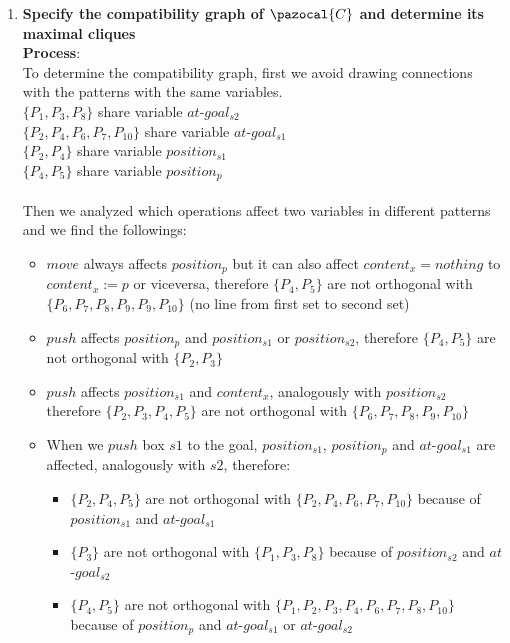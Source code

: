 \documentclass[11pt,a4paper]{article}
\begin{document}
\begin{enumerate}[label=(\alph*), listparindent=1.5em]
	\item \textbf{Specify the compatibility graph of $\pazocal{C}$ and
	determine its maximal cliques}\\
	\textbf{Process}:\\
	To determine the compatibility graph, first we avoid drawing connections with the patterns with the same variables.\\
	$\{ P_1, P_3, P_8 \}$ share variable $at$-$goal_{s2}$\\
	$\{ P_2, P_4, P_6, P_7, P_{10} \}$ share variable $at$-$goal_{s1}$\\
	$\{ P_2, P_4\}$ share variable $position_{s1}$\\
	$\{ P_4, P_5\}$ share variable $position_{p}$\\\\
	Then we analyzed which operations affect two variables in different patterns and we find the followings:
	\begin{itemize}
		\item $move$ always affects $position_p$ but it can also affect $content_x = nothing$ to $content_x := p$ or viceversa, therefore $\{ P_4, P_5 \}$ are not orthogonal with $\{P_6, P_7, P_8, P_9, P_9, P_{10}\}$ (no line from first set to second set)
		\item $push$ affects $position_p$ and $position_{s1}$ or $position_{s2}$, therefore $\{ P_4, P_5 \}$ are not orthogonal with $\{P_2, P_3\}$
		\item $push$ affects $position_{s1}$ and $content_x$, analogously with $position_{s2}$ therefore $\{ P_2, P_3, P_4, P_5\}$ are not orthogonal with $\{P_6, P_7, P_8, P_9, P_10\}$
		\item When we $push$ box $s1$ to the goal, $position_{s1}$, $position_p$ and $at$-$goal_{s1}$ are affected, analogously with $s2$, therefore:
			\begin{itemize}
				\item $\{ P_2, P_4, P_5 \}$ are not orthogonal with $\{P_2, P_4, P_6, P_7, P_{10}\}$ because of $position_{s1}$ and $at$-$goal_{s1}$
				\item $\{ P_3\}$ are not orthogonal with $\{P_1, P_3, P_8\}$ because of $position_{s2}$ and $at$-$goal_{s2}$
				\item $\{ P_4, P_5\}$ are not orthogonal with $\{P_1, P_2, P_3, P_4, P_6, P_7, P_8, P_{10}\}$ because of $position_{p}$ and $at$-$goal_{s1}$ or $at$-$goal_{s2}$
			\end{itemize}

\end{itemize}
\end{enumerate}
\end{document}

